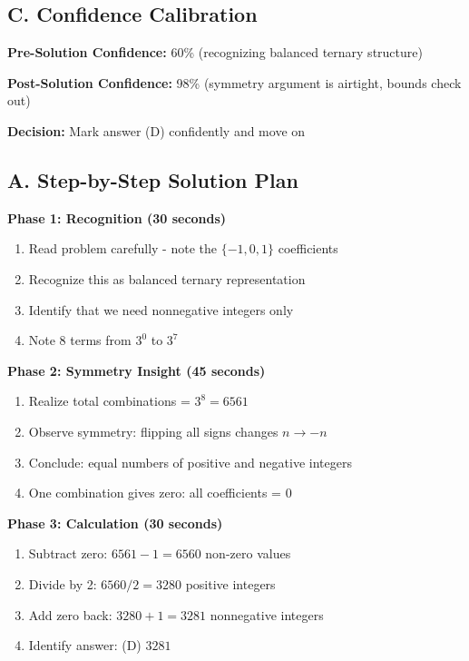 \documentclass[12pt]{article}
\begin{document}
\begin{verificationbox}
\subsection*{C. Confidence Calibration}

\textbf{Pre-Solution Confidence:} 60\% (recognizing balanced ternary structure)

\textbf{Post-Solution Confidence:} 98\% (symmetry argument is airtight, bounds check out)

\textbf{Decision:} Mark answer (D) confidently and move on
\end{verificationbox}

\begin{roadmapbox}
\subsection*{A. Step-by-Step Solution Plan}

\textbf{Phase 1: Recognition (30 seconds)}
\begin{enumerate}
    \item Read problem carefully - note the $\{-1,0,1\}$ coefficients
    \item Recognize this as balanced ternary representation
    \item Identify that we need nonnegative integers only
    \item Note 8 terms from $3^0$ to $3^7$
\end{enumerate}

\textbf{Phase 2: Symmetry Insight (45 seconds)}
\begin{enumerate}
    \item Realize total combinations = $3^8 = 6561$
    \item Observe symmetry: flipping all signs changes $n \to -n$
    \item Conclude: equal numbers of positive and negative integers
    \item One combination gives zero: all coefficients = 0
\end{enumerate}

\textbf{Phase 3: Calculation (30 seconds)}
\begin{enumerate}
    \item Subtract zero: $6561 - 1 = 6560$ non-zero values
    \item Divide by 2: $6560 / 2 = 3280$ positive integers
    \item Add zero back: $3280 + 1 = 3281$ nonnegative integers
    \item Identify answer: (D) $3281$
\end{enumerate}


\end{roadmapbox}
\end{document}
